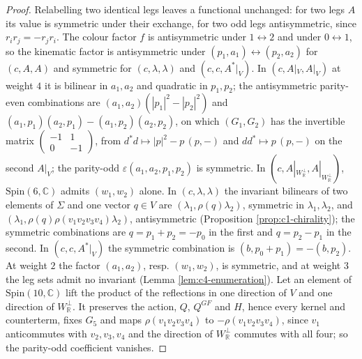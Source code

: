 \begin{proof}
Relabelling two identical legs leaves a functional unchanged: for two legs $A$ its value is symmetric under their exchange, for two odd legs antisymmetric, since $r_ir_j=-r_jr_i$. The colour factor $f$ is antisymmetric under $1\leftrightarrow2$ and under $0\leftrightarrow1$, so the kinematic factor is antisymmetric under $(p_1,a_1)\leftrightarrow(p_2,a_2)$ for $(c,A,A)$ and symmetric for $(c,\lambda,\lambda)$ and $(c,c,A^*|_V)$. In $(c,A|_V,A|_V)$ at weight $4$ it is bilinear in $a_1,a_2$ and quadratic in $p_1,p_2$; the antisymmetric parity-even combinations are $(a_1,a_2)(|p_1|^2-|p_2|^2)$ and $(a_1,p_1)(a_2,p_1)-(a_1,p_2)(a_2,p_2)$, on which $(G_1,G_2)$ has the invertible matrix $\begin{pmatrix}-1&1\\0&-1\end{pmatrix}$, from $d^*d\mapsto|p|^2-p\,(p,-)$ and $dd^*\mapsto p\,(p,-)$ on the second $A|_V$; the parity-odd $\varepsilon(a_1,a_2,p_1,p_2)$ is symmetric. In $(c,A|_{W_{\mathbb R}^\perp},A|_{W_{\mathbb R}^\perp})$, $\mathrm{Spin}(6,\mathbb C)$ admits $(w_1,w_2)$ alone. In $(c,\lambda,\lambda)$ the invariant bilinears of two elements of $\Sigma$ and one vector $q\in V$ are $(\lambda_1,\rho(q)\lambda_2)$, symmetric in $\lambda_1,\lambda_2$, and $(\lambda_1,\rho(q)\rho(v_1v_2v_3v_4)\lambda_2)$, antisymmetric (Proposition \ref{prop:c1-chirality}); the symmetric combinations are $q=p_1+p_2=-p_0$ in the first and $q=p_2-p_1$ in the second. In $(c,c,A^*|_V)$ the symmetric combination is $(b,p_0+p_1)=-(b,p_2)$. At weight $2$ the factor $(a_1,a_2)$, resp. $(w_1,w_2)$, is symmetric, and at weight $3$ the leg sets admit no invariant (Lemma \ref{lem:c4-enumeration}). Let an element of $\mathrm{Spin}(10,\mathbb C)$ lift the product of the reflections in one direction of $V$ and one direction of $W_{\mathbb R}^\perp$. It preserves the action, $Q$, $Q^{GF}$ and $H$, hence every kernel and counterterm, fixes $G_5$ and maps $\rho(v_1v_2v_3v_4)$ to $-\rho(v_1v_2v_3v_4)$, since $v_1$ anticommutes with $v_2,v_3,v_4$ and the direction of $W_{\mathbb R}^\perp$ commutes with all four; so the parity-odd coefficient vanishes.
\end{proof}

